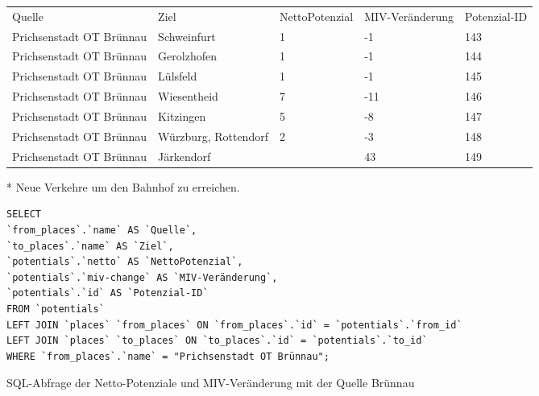 \begin{tabular}{ l  l  l  l  l }
Quelle & Ziel & NettoPotenzial & MIV-Veränderung & Potenzial-ID\\ 
Prichsenstadt OT Brünnau & Schweinfurt & 1 & -1 & 143\\ 
Prichsenstadt OT Brünnau & Gerolzhofen & 1 & -1 & 144\\ 
Prichsenstadt OT Brünnau & Lülsfeld & 1 & -1 & 145\\ 
Prichsenstadt OT Brünnau & Wiesentheid & 7 & -11 & 146\\ 
Prichsenstadt OT Brünnau & Kitzingen & 5 & -8 & 147\\ 
Prichsenstadt OT Brünnau & Würzburg, Rottendorf & 2 & -3 & 148\\ 
Prichsenstadt OT Brünnau & Järkendorf &  & 43 & 149\\ 
\end{tabular}
\newline
\newline
* Neue Verkehre um den Bahnhof zu erreichen.
\newline
\begin{listing}[htbp]
\begin{verbatim}
SELECT
`from_places`.`name` AS `Quelle`, 
`to_places`.`name` AS `Ziel`, 
`potentials`.`netto` AS `NettoPotenzial`, 
`potentials`.`miv-change` AS `MIV-Veränderung`, 
`potentials`.`id` AS `Potenzial-ID`
FROM `potentials`
LEFT JOIN `places` `from_places` ON `from_places`.`id` = `potentials`.`from_id`
LEFT JOIN `places` `to_places` ON `to_places`.`id` = `potentials`.`to_id`
WHERE `from_places`.`name` = "Prichsenstadt OT Brünnau";
\end{verbatim}
\caption{SQL-Abfrage der Netto-Potenziale und MIV-Veränderung mit der Quelle Brünnau}\label{lst-fz-bruennau}
\end{listing}